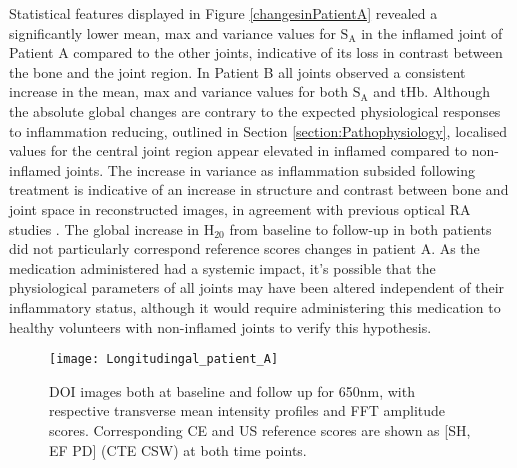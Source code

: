 \documentclass[twoside]{bhamthesis}
\theoremstyle{definition}
\begin{document}
Statistical features displayed in Figure \ref{changesinPatientA} revealed a significantly lower mean, max and variance values for $\mathrm{S_A}$ in the inflamed joint of Patient A compared to the other joints, indicative of its loss in contrast between the bone and the joint region. In Patient B all joints observed a consistent increase in the mean, max and variance values for both $\mathrm{S_A}$ and tHb. Although the absolute global changes are contrary to the expected physiological responses to inflammation reducing, outlined in Section 
\ref{section:Pathophysiology}, localised values for the central joint region appear elevated in inflamed compared to non-inflamed joints. The increase in variance as inflammation subsided following treatment is indicative of an increase in structure and contrast between bone and joint space in reconstructed images, in agreement with previous optical RA studies \cite{montejo2013computer,yuan2010image}. The global increase in $\mathrm{H_20}$ from baseline to follow-up in both patients did not particularly correspond reference scores changes in patient A. As the medication administered had a systemic impact, it's possible that the physiological parameters of all joints may have been altered independent of their inflammatory status, although it would require administering this medication to healthy volunteers with non-inflamed joints to verify this hypothesis.

\begin{figure}[!ht]
\centering\texttt{[image: Longitudingal\_patient\_A]}\caption{DOI images both at baseline and follow up for 650nm, with respective transverse mean intensity profiles and FFT amplitude scores. Corresponding CE and US reference scores are shown as [SH, EF PD] (CTE CSW) at both time points.}
\label{Longitudingal_patient_A}
\end{figure}
\end{document}

